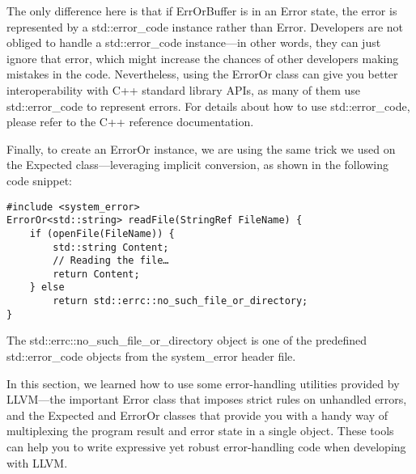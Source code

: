 The only difference here is that if ErrOrBuffer is in an Error state, the error is represented by a std::error\_code instance rather than Error. Developers are not obliged to handle a std::error\_code instance—in other words, they can just ignore that error, which might increase the chances of other developers making mistakes in the code. Nevertheless, using the ErrorOr class can give you better interoperability with C++ standard library APIs, as many of them use std::error\_code to represent errors. For details about how to use std::error\_code, please refer to the C++ reference documentation.

Finally, to create an ErrorOr instance, we are using the same trick we used on the Expected class—leveraging implicit conversion, as shown in the following code snippet:

\begin{lstlisting}[style=styleCXX]
#include <system_error>
ErrorOr<std::string> readFile(StringRef FileName) {
	if (openFile(FileName)) {
		std::string Content;
		// Reading the file…
		return Content;
	} else
		return std::errc::no_such_file_or_directory;
}
\end{lstlisting}

The std::errc::no\_such\_file\_or\_directory object is one of the predefined std::error\_code objects from the system\_error header file.

In this section, we learned how to use some error-handling utilities provided by LLVM—the important Error class that imposes strict rules on unhandled errors, and the Expected and ErrorOr classes that provide you with a handy way of multiplexing the program result and error state in a single object. These tools can help you to write expressive yet robust error-handling code when developing with LLVM.






